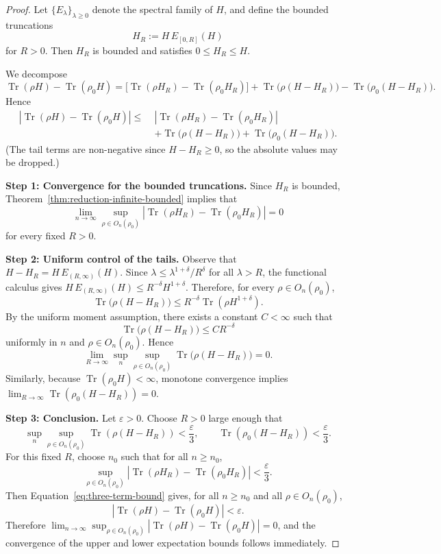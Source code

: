 \documentclass[11pt, onecolumn]{article}
\begin{document}
\begin{proof}
Let $\{E_\lambda\}_{\lambda\ge0}$ denote the spectral family of $H$, and define the bounded truncations
\[
H_R := H\,E_{[0,R]}(H)
\]
for $R>0$. Then $H_R$ is bounded and satisfies $0\le H_R\le H$.

We decompose
\[
\operatorname{Tr}(\rho H)-\operatorname{Tr}(\rho_0 H)
=
\bigl[\operatorname{Tr}(\rho H_R)-\operatorname{Tr}(\rho_0 H_R)\bigr]
+
\operatorname{Tr}\bigl(\rho(H-H_R)\bigr)
-
\operatorname{Tr}\bigl(\rho_0(H-H_R)\bigr).
\]
Hence
\begin{align}
\left|
\operatorname{Tr}(\rho H)-\operatorname{Tr}(\rho_0 H)
\right|
\le\;&
\left|
\operatorname{Tr}(\rho H_R)-\operatorname{Tr}(\rho_0 H_R)
\right|
\nonumber\\
&+
\operatorname{Tr}\bigl(\rho(H-H_R)\bigr)
+
\operatorname{Tr}\bigl(\rho_0(H-H_R)\bigr).
\label{eq:three-term-bound}
\end{align}
(The tail terms are non-negative since $H - H_R \ge 0$, so the absolute values may be dropped.)

\medskip
\noindent
\textbf{Step 1: Convergence for the bounded truncations.}
Since $H_R$ is bounded, Theorem~\ref{thm:reduction-infinite-bounded} implies that
\[
\lim_{n\to\infty}
\sup_{\rho\in O_n(\rho_0)}
\left|
\operatorname{Tr}(\rho H_R)-\operatorname{Tr}(\rho_0 H_R)
\right|
=0
\]
for every fixed $R>0$.

\medskip
\noindent
\textbf{Step 2: Uniform control of the tails.}
Observe that $H-H_R = H\,E_{(R,\infty)}(H)$. Since $\lambda \le \lambda^{1+\delta}/R^\delta$ for all $\lambda>R$, the functional calculus gives $H\,E_{(R,\infty)}(H)\le R^{-\delta} H^{1+\delta}$. Therefore, for every $\rho\in O_n(\rho_0)$,
\[
\operatorname{Tr}\bigl(\rho(H-H_R)\bigr)
\le
R^{-\delta}\operatorname{Tr}(\rho H^{1+\delta}).
\]
By the uniform moment assumption, there exists a constant $C<\infty$ such that
\[
\operatorname{Tr}\bigl(\rho(H-H_R)\bigr)
\le
C R^{-\delta}
\]
uniformly in $n$ and $\rho\in O_n(\rho_0)$. Hence
\[
\lim_{R\to\infty}
\sup_n\sup_{\rho\in O_n(\rho_0)}
\operatorname{Tr}\bigl(\rho(H-H_R)\bigr)
=0.
\]
Similarly, because $\operatorname{Tr}(\rho_0 H)<\infty$, monotone convergence implies $\lim_{R\to\infty}\operatorname{Tr}(\rho_0(H-H_R))=0$.

\medskip
\noindent
\textbf{Step 3: Conclusion.}
Let $\varepsilon>0$. Choose $R>0$ large enough that
\[
\sup_n\sup_{\rho\in O_n(\rho_0)}\operatorname{Tr}(\rho(H-H_R))<\frac\varepsilon3,
\qquad
\operatorname{Tr}(\rho_0(H-H_R))<\frac\varepsilon3.
\]
For this fixed $R$, choose $n_0$ such that for all $n\ge n_0$,
\[
\sup_{\rho\in O_n(\rho_0)}|\operatorname{Tr}(\rho H_R)-\operatorname{Tr}(\rho_0 H_R)|<\frac\varepsilon3.
\]
Then Equation~\eqref{eq:three-term-bound} gives, for all $n\ge n_0$ and all $\rho\in O_n(\rho_0)$,
\[
|\operatorname{Tr}(\rho H)-\operatorname{Tr}(\rho_0 H)|<\varepsilon.
\]
Therefore $\lim_{n\to\infty}\sup_{\rho\in O_n(\rho_0)}|\operatorname{Tr}(\rho H)-\operatorname{Tr}(\rho_0 H)|=0$, and the convergence of the upper and lower expectation bounds follows immediately.
\end{proof}
\end{document}
